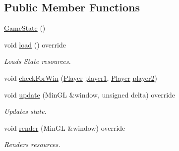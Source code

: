 \subsection*{Public Member Functions}
\begin{DoxyCompactItemize}
\item 
\hyperlink{class_game_state_a4fa0a2bf50315c4a35a3890a0adcee5c}{Game\+State} ()
\item 
void \hyperlink{class_game_state_ab89118f53bfc362e67e061539f3181da}{load} () override
\begin{DoxyCompactList}\small\item\em Loads State resources. \end{DoxyCompactList}\item 
void \hyperlink{class_game_state_a86a90115c9f75974b0dba76c057b2cee}{check\+For\+Win} (\hyperlink{classns_game_1_1_player}{Player} \hyperlink{class_game_state_a4de1875551db7326acb57b305dee02ac}{player1}, \hyperlink{classns_game_1_1_player}{Player} \hyperlink{class_game_state_a72c17b0083dee464947c0532b5bfefcd}{player2})
\item 
void \hyperlink{class_game_state_a1d57727f6910092368b4a1a5a598b0d0}{update} (Min\+GL \&window, unsigned delta) override
\begin{DoxyCompactList}\small\item\em Updates state. \end{DoxyCompactList}\item 
void \hyperlink{class_game_state_aa3665a5b951ec00ead47902e4c8df627}{render} (Min\+GL \&window) override
\begin{DoxyCompactList}\small\item\em Renders resources. \end{DoxyCompactList}\end{DoxyCompactItemize}
